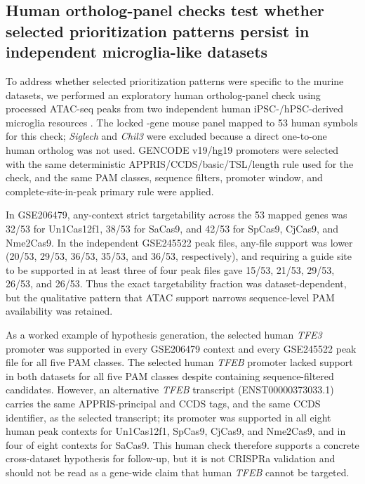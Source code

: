 \documentclass[11pt]{article}
\begin{document}
\subsection{Human ortholog-panel checks test whether selected prioritization patterns persist in independent microglia-like datasets}

To address whether selected prioritization patterns were specific to the murine datasets, we performed an exploratory human ortholog-panel check using processed ATAC-seq peaks from two independent human iPSC-/hPSC-derived microglia resources \citep{yang2023advariants,booms2024pdrisk}. The locked \NPanel{}-gene mouse panel mapped to 53 human symbols for this check; \textit{Siglech} and \textit{Chil3} were excluded because a direct one-to-one human ortholog was not used. GENCODE v19/hg19 promoters were selected with the same deterministic APPRIS/CCDS/basic/TSL/length rule used for the check, and the same PAM classes, sequence filters, promoter window, and complete-site-in-peak primary rule were applied.

In GSE206479, any-context strict targetability across the 53 mapped genes was 32/53 for Un1Cas12f1, 38/53 for SaCas9, and 42/53 for SpCas9, CjCas9, and Nme2Cas9. In the independent GSE245522 peak files, any-file support was lower (20/53, 29/53, 36/53, 35/53, and 36/53, respectively), and requiring a guide site to be supported in at least three of four peak files gave 15/53, 21/53, 29/53, 26/53, and 26/53. Thus the exact targetability fraction was dataset-dependent, but the qualitative pattern that ATAC support narrows sequence-level PAM availability was retained.

As a worked example of hypothesis generation, the selected human \textit{TFE3} promoter was supported in every GSE206479 context and every GSE245522 peak file for all five PAM classes. The selected human \textit{TFEB} promoter lacked support in both datasets for all five PAM classes despite containing sequence-filtered candidates. However, an alternative \textit{TFEB} transcript (ENST00000373033.1) carries the same APPRIS-principal and CCDS tags, and the same CCDS identifier, as the selected transcript; its promoter was supported in all eight human peak contexts for Un1Cas12f1, SpCas9, CjCas9, and Nme2Cas9, and in four of eight contexts for SaCas9. This human check therefore supports a concrete cross-dataset hypothesis for follow-up, but it is not CRISPRa validation and should not be read as a gene-wide claim that human \textit{TFEB} cannot be targeted.
\end{document}
